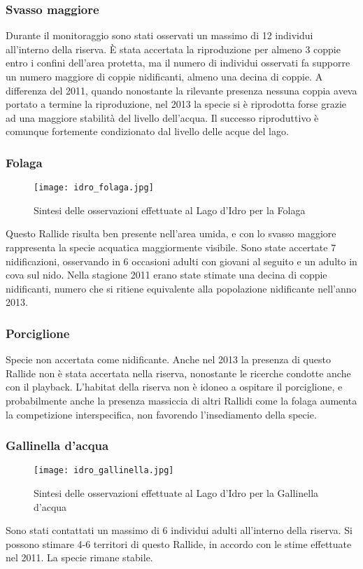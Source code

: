 \documentclass[11pt,a4paper,twoside]{memoir}
\begin{document}
\subsubsection{Svasso maggiore}
Durante il monitoraggio sono stati osservati un massimo di 12 individui all'interno della riserva. È stata accertata la riproduzione per almeno 3 coppie entro i confini dell'area  protetta, ma il numero di individui osservati fa supporre un numero maggiore di coppie nidificanti, almeno una decina di coppie. A differenza del 2011, quando nonostante la rilevante presenza nessuna coppia aveva portato a termine la riproduzione, nel 2013 la specie si è riprodotta forse grazie ad una maggiore  stabilità del livello dell'acqua. Il successo riproduttivo è comunque fortemente condizionato dal livello delle acque del lago. 
\subsubsection{Folaga}
\vspace*{\fill} \begin{figure}[H]
  \centering
  \texttt{[image: idro\_folaga.jpg]}
  \caption{Sintesi delle osservazioni effettuate al Lago d'Idro per la Folaga}
\end{figure}\vspace*{\fill}
Questo Rallide risulta ben presente nell'area umida, e con lo svasso maggiore rappresenta la specie acquatica maggiormente visibile. Sono state accertate 7 nidificazioni, osservando in 6 occasioni adulti con giovani al seguito e un adulto in cova sul nido. Nella stagione 2011 erano state stimate una decina di coppie nidificanti, numero che si ritiene equivalente alla popolazione nidificante nell'anno 2013.
\subsubsection{Porciglione}
Specie non accertata come nidificante. Anche nel 2013 la presenza di questo Rallide non è stata accertata nella riserva, nonostante le ricerche condotte anche con il playback. L'habitat della riserva non è idoneo a ospitare il porciglione, e probabilmente anche la presenza massiccia di altri Rallidi come la folaga aumenta la competizione interspecifica, non favorendo l'insediamento della specie.
\subsubsection{Gallinella d'acqua}
\vspace*{\fill} \begin{figure}[H]
  \centering
  \texttt{[image: idro\_gallinella.jpg]}
  \caption{Sintesi delle osservazioni effettuate al Lago d'Idro per la Gallinella d'acqua}
\end{figure}\vspace*{\fill}
Sono stati contattati un massimo di 6 individui adulti all'interno della riserva. Si possono stimare 4-6 territori di questo Rallide, in accordo con le stime effettuate nel 2011. La specie rimane stabile.
\end{document}

